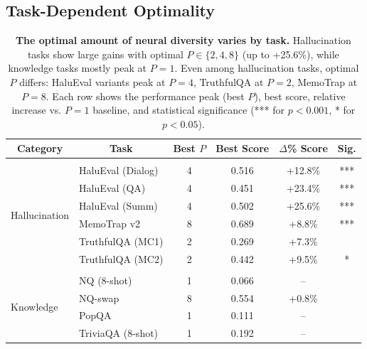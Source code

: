 \documentclass{article} %
\begin{document}
\subsection{Task-Dependent Optimality}
\begin{table}[t]
  \begin{center}
    \begin{tabular}{ll|cccc}
      \multicolumn{1}{c}{\bf Category} &
      \multicolumn{1}{c}{\bf Task} &
      \multicolumn{1}{c}{\bf Best $P$} &
      \multicolumn{1}{c}{\bf Best Score} &
      \multicolumn{1}{c}{\bf ${\Delta}$\% Score} &
      \multicolumn{1}{c}{\bf Sig.}
      \\ \hline \\[-0.75em]
      \multirow{6}{*}{Hallucination}
      & HaluEval (Dialog)    & 4 & 0.516 & +12.8\% & *** \\
      & HaluEval (QA)        & 4 & 0.451 & +23.4\% & *** \\
      & HaluEval (Summ)      & 4 & 0.502 & +25.6\% & *** \\
      & MemoTrap v2          & 8 & 0.689 & +8.8\%  & *** \\
      & TruthfulQA (MC1)     & 2 & 0.269 & +7.3\%  & \\
      & TruthfulQA (MC2)     & 2 & 0.442 & +9.5\%  & * \\
      \hline \\[-0.75em]
      \multirow{4}{*}{Knowledge}
      & NQ (8-shot)          & 1 & 0.066 & --      & \\
      & NQ-swap              & 8 & 0.554 & +0.8\%  & \\
      & PopQA                & 1 & 0.111 & --      & \\
      & TriviaQA (8-shot)    & 1 & 0.192 & --      & \\
    \end{tabular}
  \end{center}
  \caption{\textbf{The optimal amount of neural diversity varies by task.} Hallucination tasks show large gains
    with optimal $P \in \{2,4,8\}$ (up to +25.6\%), while knowledge tasks mostly peak at $P=1$. Even among
    hallucination tasks, optimal $P$ differs: HaluEval variants peak at $P=4$, TruthfulQA at $P=2$, MemoTrap at
    $P=8$. Each row shows the performance peak (best $P$), best score, relative increase vs. $P=1$ baseline, and
  statistical significance (*** for $p < 0.001$, * for $p < 0.05$).}
  \label{tab:taskdiv}
\end{table}
\end{document}
